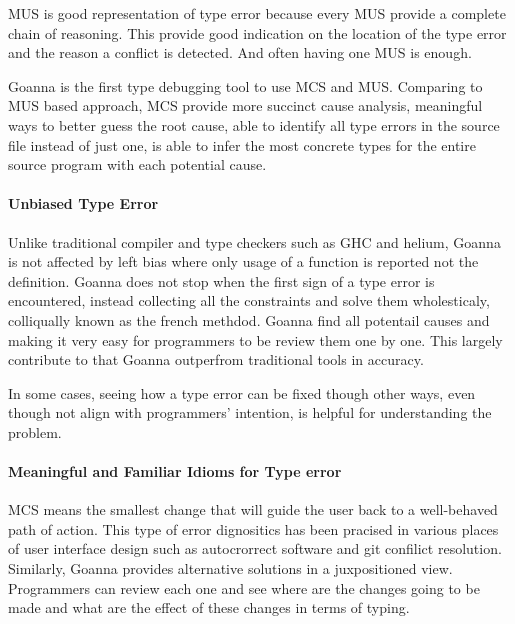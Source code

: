 \documentclass[pdflatex,sn-mathphys-num]{sn-jnl}%
\begin{document}
    MUS is good representation of type error because every MUS provide a complete chain of reasoning. This provide good indication on the location of the type error and the reason a conflict is detected. And often having one MUS is enough.

    Goanna is the first type debugging tool to use MCS and MUS. Comparing to MUS based approach, MCS provide more succinct cause analysis, meaningful ways to better guess the root cause, able to identify all type errors in the source file instead of just one, is able to infer the most concrete types for the entire source program with each potential cause.
    
    \paragraph{Unbiased Type Error}
    Unlike traditional compiler and type checkers such as GHC and helium, Goanna is not affected by left bias where only usage of a function is reported not the definition. Goanna does not stop when the first sign of a type error is encountered, instead collecting all the constraints and solve them wholesticaly, colliqually known as the french methdod. Goanna find all potentail causes and making it very easy for programmers to be review them one by one.
    This largely contribute to that Goanna outperfrom traditional tools in accuracy.
    
    In some cases, seeing how a type error can be fixed though other ways, even though not align with programmers' intention, is helpful for understanding the problem. 


    \paragraph{Meaningful and Familiar Idioms for Type error}
    MCS means the smallest change that will guide the user back to a well-behaved path of action. This type of error dignositics has been pracised in various places of user interface design such as autocrorrect software and git confilict resolution. Similarly, Goanna provides alternative solutions in a juxpositioned view. Programmers can review each one and see where are the changes going to be made and what are the effect of these changes in terms of typing.
\end{document}
